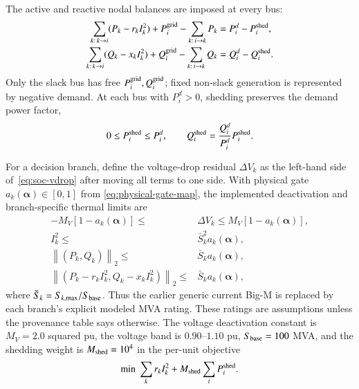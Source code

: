 \documentclass[5p,twocolumn,number,sort&compress,nopreprintline]{elsarticle}
\begin{document}
The active and reactive nodal balances are imposed at every bus:
\begin{subequations}\label{eq:soc-balance}
\begin{align}
\sum_{k:\,k\to i}(P_k-r_kI_k^2)+P_i^{\rm grid}
-\sum_{k:\,i\to k}P_k
={}&P_i^d-P_i^{\rm shed},\\
\sum_{k:\,k\to i}(Q_k-x_kI_k^2)+Q_i^{\rm grid}
-\sum_{k:\,i\to k}Q_k
={}&Q_i^d-Q_i^{\rm shed}.
\end{align}
\end{subequations}
Only the slack bus has free $P_i^{\rm grid},Q_i^{\rm grid}$; fixed
non-slack generation is represented by negative demand. At each bus
with $P_i^d>0$, shedding preserves the demand power factor,
\begin{equation}\label{eq:fixed-pf-shed}
0\le P_i^{\rm shed}\le P_i^d,\qquad
Q_i^{\rm shed}=\frac{Q_i^d}{P_i^d}P_i^{\rm shed}.
\end{equation}

For a decision branch, define the voltage-drop residual $\Delta V_k$
as the left-hand side of~\eqref{eq:soc-vdrop} after moving all terms to
one side. With physical gate $a_k(\boldsymbol\alpha)\in[0,1]$ from
\eqref{eq:physical-gate-map}, the implemented deactivation and
branch-specific thermal limits are
\begin{subequations}\label{eq:soc-gating}
\begin{align}
-M_V[1-a_k(\boldsymbol\alpha)]\le{}&\Delta V_k
\le M_V[1-a_k(\boldsymbol\alpha)],\\
I_k^2\le{}&\bar S_k^2a_k(\boldsymbol\alpha),\\
\left\|(P_k,Q_k)\right\|_2\le{}&\bar S_ka_k(\boldsymbol\alpha),\\
\left\|(P_k-r_kI_k^2,Q_k-x_kI_k^2)\right\|_2
\le{}&\bar S_ka_k(\boldsymbol\alpha),
\end{align}
\end{subequations}
where $\bar S_k=S_{k,\max}/S_{\rm base}$. Thus the earlier generic
current Big-M is replaced by each branch's explicit modeled MVA rating.
These ratings are assumptions unless the provenance table says otherwise. The
voltage deactivation constant is $M_V=2.0$ squared pu, the voltage band
is $0.90$--$1.10$ pu, $S_{\rm base}=100$ MVA, and the shedding weight is
$M_{\rm shed}=10^4$ in the per-unit objective
\begin{equation}
\min\;\sum_k r_k I_k^2+M_{\rm shed}\sum_iP_i^{\rm shed}.
\end{equation}
\end{document}
